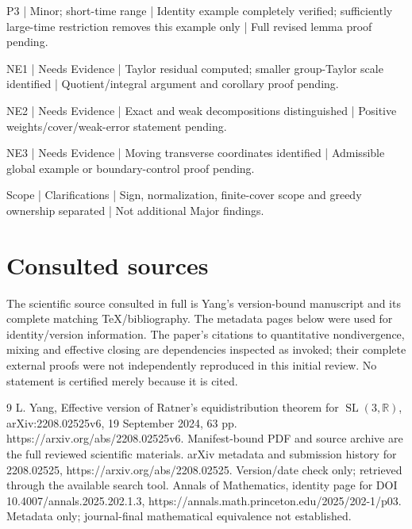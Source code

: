 \documentclass[10pt]{article}
\begin{document}
P3 | Minor; short-time range | Identity example completely verified; sufficiently large-time restriction removes this example only | Full revised lemma proof pending.\par
NE1 | Needs Evidence | Taylor residual computed; smaller group-Taylor scale identified | Quotient/integral argument and corollary proof pending.\par
NE2 | Needs Evidence | Exact and weak decompositions distinguished | Positive weights/cover/weak-error statement pending.\par
NE3 | Needs Evidence | Moving transverse coordinates identified | Admissible global example or boundary-control proof pending.\par
Scope | Clarifications | Sign, normalization, finite-cover scope and greedy ownership separated | Not additional Major findings.\par
\section*{Consulted sources}
The scientific source consulted in full is Yang’s version-bound manuscript and its complete matching TeX/bibliography. The metadata pages below were used for identity/version information. The paper’s citations to quantitative nondivergence, mixing and effective closing are dependencies inspected as invoked; their complete external proofs were not independently reproduced in this initial review. No statement is certified merely because it is cited.\par
9 L. Yang, Effective version of Ratner’s equidistribution theorem for \(\operatorname{SL}(3,\mathbb R)\), arXiv:2208.02525v6, 19 September 2024, 63 pp. https://arxiv.org/abs/2208.02525v6. Manifest-bound PDF and source archive are the full reviewed scientific materials. arXiv metadata and submission history for 2208.02525, https://arxiv.org/abs/2208.02525. Version/date check only; retrieved through the available search tool. Annals of Mathematics, identity page for DOI 10.4007/annals.2025.202.1.3, https://annals.math.princeton.edu/2025/202-1/p03. Metadata only; journal-final mathematical equivalence not established.\par
\end{document}
